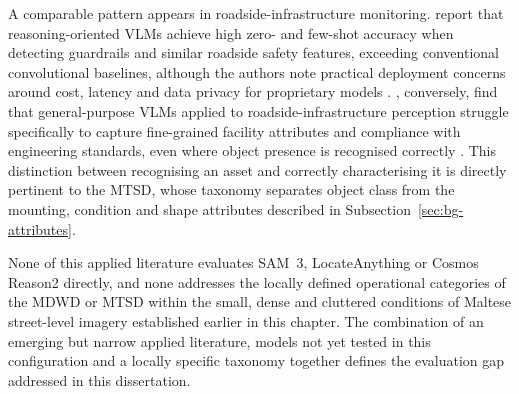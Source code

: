 A comparable pattern appears in roadside-infrastructure monitoring. \citeauthor{sadeghi2026roadsidevlm} report that reasoning-oriented \glspl{VLM} achieve high zero- and few-shot accuracy when detecting guardrails and similar roadside safety features, exceeding conventional convolutional baselines, although the authors note practical deployment concerns around cost, latency and data privacy for proprietary models \cite{sadeghi2026roadsidevlm}. \citeauthor{fu2026roadsideinfrastructurevlm}, conversely, find that general-purpose \glspl{VLM} applied to roadside-infrastructure perception struggle specifically to capture fine-grained facility attributes and compliance with engineering standards, even where object presence is recognised correctly \cite{fu2026roadsideinfrastructurevlm}. This distinction between recognising an asset and correctly characterising it is directly pertinent to the \gls{MTSD}, whose taxonomy separates object class from the mounting, condition and shape attributes described in Subsection~\ref{sec:bg-attributes}.

None of this applied literature evaluates \gls{SAM}~3, LocateAnything or Cosmos Reason2 directly, and none addresses the locally defined operational categories of the \gls{MDWD} or \gls{MTSD} within the small, dense and cluttered conditions of Maltese street-level imagery established earlier in this chapter. The combination of an emerging but narrow applied literature, models not yet tested in this configuration and a locally specific taxonomy together defines the evaluation gap addressed in this dissertation.


